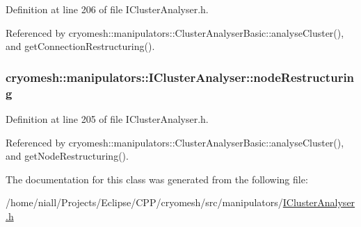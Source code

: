 \-Definition at line 206 of file \-I\-Cluster\-Analyser.\-h.



\-Referenced by cryomesh\-::manipulators\-::\-Cluster\-Analyser\-Basic\-::analyse\-Cluster(), and get\-Connection\-Restructuring().

\hypertarget{classcryomesh_1_1manipulators_1_1IClusterAnalyser_a78d90b9829e4188ded3d94da49c6887a}{
\subsubsection[{node\-Restructuring}]{ {\bf cryomesh\-::manipulators\-::\-I\-Cluster\-Analyser\-::node\-Restructuring}}}\label{classcryomesh_1_1manipulators_1_1IClusterAnalyser_a78d90b9829e4188ded3d94da49c6887a}


\-Definition at line 205 of file \-I\-Cluster\-Analyser.\-h.



\-Referenced by cryomesh\-::manipulators\-::\-Cluster\-Analyser\-Basic\-::analyse\-Cluster(), and get\-Node\-Restructuring().



\-The documentation for this class was generated from the following file\-:\begin{DoxyCompactItemize}
\item 
/home/niall/\-Projects/\-Eclipse/\-C\-P\-P/cryomesh/src/manipulators/\hyperlink{IClusterAnalyser_8h}{\-I\-Cluster\-Analyser.\-h}\end{DoxyCompactItemize}
